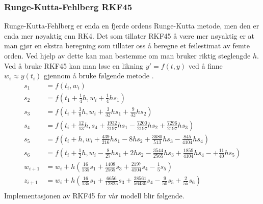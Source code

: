 \subsubsection{Runge-Kutta-Fehlberg RKF45}
Runge-Kutta-Fehlberg er enda en fjerde ordens Runge-Kutta metode, men den er enda mer nøyaktig enn RK4. Det som tillater RKF45 å være mer nøyaktig er at man gjør en ekstra beregning som tillater oss å beregne et feilestimat av femte orden. Ved hjelp av dette kan man bestemme om man bruker riktig steglengde $h$.\newline\newline
Ved å bruke RKF45 kan man løse en likning $y' = f(t, y)$ ved å finne $w_i \approx y(t_i)$ gjennom å bruke følgende metode \cite{MATEMATIKK:1}. 
\begin{equation}
\begin{aligned}
    s_1&=f(t_i, w_i)\\
    s_2&=f(t_1+\frac{1}{4}h, w_i + \frac{1}{4}hs_1)\\
    s_3&=f(t_i+\frac{3}{8}h, w_i+\frac{3}{32}hs_1+\frac{9}{32}hs_2)\\
    s_4&=f(t_i+\frac{12}{13}h, s_4+\frac{1932}{2197}hs_1-\frac{7200}{2197}hs_2+\frac{7296}{2197}hs_3)\\
    s_5&=f(t_i+h, w_i + \frac{439}{216}hs_1-8hs_2+\frac{3680}{513}hs_3-\frac{845}{4104}hs_4)\\
    s_6&=f(t_i+\frac{1}{2}h, w_i-\frac{8}{27}hs_1+2hs_2-\frac{3544}{2565}hs_3+\frac{1859}{4104}hs_4-+\frac{11}{40}hs_5)\\
    w_{i+1}&=w_i+h(\frac{16}{135}s_1+\frac{1408}{2565}s_3+\frac{2197}{4104}s_4-\frac{1}{5}s_5)\\
    z_{i+1}&=w_i+h(\frac{16}{135}s_1+\frac{6656}{12825}s_3+\frac{28561}{56430}s_4-\frac{9}{50}s_5+\frac{2}{55}s_6)\\
\end{aligned}
\end{equation}
Implementasjonen av RKF45 for vår modell blir følgende.

